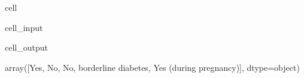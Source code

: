 \documentclass[letterpaper,10pt,english]{jupyterBook}
\begin{document}
\begin{sphinxuseclass}{cell}\begin{sphinxVerbatimInput}

\begin{sphinxuseclass}{cell_input}
\begin{sphinxVerbatim}[commandchars=\\\{\}]
\PYG{p}{[}\PYG{p}{]}
\end{sphinxVerbatim}

\end{sphinxuseclass}\end{sphinxVerbatimInput}
\begin{sphinxVerbatimOutput}

\begin{sphinxuseclass}{cell_output}
\begin{sphinxVerbatim}[commandchars=\\\{\}]
array([\PYGZsq{}Yes\PYGZsq{}, \PYGZsq{}No\PYGZsq{}, \PYGZsq{}No, borderline diabetes\PYGZsq{}, \PYGZsq{}Yes (during pregnancy)\PYGZsq{}],
      dtype=object)
\end{sphinxVerbatim}

\end{sphinxuseclass}\end{sphinxVerbatimOutput}

\end{sphinxuseclass}
\end{document}
